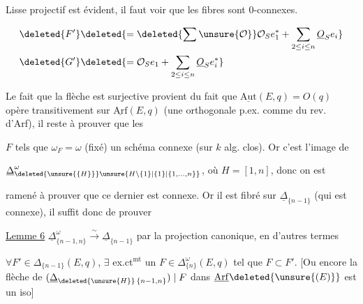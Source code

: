Lisse projectif est évident, il faut voir que les fibres  sont $0$-connexes.


\[
\begin{aligned}
\deleted{F'}&\deleted{=\deleted{\sum\unsure{\mathcal O}}\mathcal O_S e_1^*+\sum_{2\leq i\leq n}\underline O_S e_i}\\
\deleted{G'}&\deleted{=\mathcal O_S e_1+\sum_{2\leq i\leq n}\underline O_S e_i^*}
\end{aligned}
\]

Le fait que la flèche est surjective provient du fait que $\underline{\mathrm{Aut}}(E,q)=O(q)$ opère transitivement sur $\underline{\mathrm{Arf}}(E,q)$ (une  orthogonale p.ex.   comme   du rev. d'Arf), il reste à prouver que les

  $F$ tels que $\omega_F=\omega$ (fixé)   un schéma connexe (sur $k$ alg. clos). Or c'est l'image de

$\underline\Delta_{\deleted{\unsure{\{H\}}}\unsure{H\setminus\{1\}|\{1\}|\{1,\ldots,n\}}}^{\omega}$, où $H=[1,n]$, donc on est


ramené à prouver que ce dernier est connexe. Or il est fibré sur $\underline\Delta_{\{n-1\}}$ (qui est connexe), il suffit donc de prouver

\uline{Lemme 6} $\underline\Delta_{\{n-1,n\}}^\omega\xrightarrow{\sim}\underline\Delta_{\{n-1\}}$ par la projection canonique, en d'autres termes


$\forall F'\in\Delta_{\{n-1\}}(E,q)$, $\exists$ ex.ct$^{\mathrm{mt}}$ un $F\in\Delta_{\{n\}}^\omega(E,q)$ tel que $F\subset F'$. [Ou encore la flèche de $(\underline\Delta_{\deleted{\unsure{H}}\,\{n-1,n\}})\mid F$ dans $\underline{\mathrm{Arf}}\deleted{\unsure{(E)}}$ est un iso]


